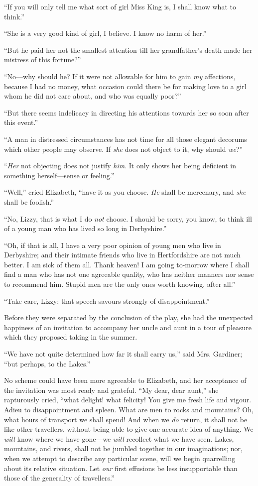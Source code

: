 \documentclass[12pt]{book}
\begin{document}
``If you will only tell me what sort of girl Miss King is, I shall know what to think.''

``She is a very good kind of girl, I believe. I know no harm of her.''

``But he paid her not the smallest attention till her grandfather's death made her mistress of this fortune?''

``No---why should he? If it were not allowable for him to gain \textit{my} affections, because I had no money, what occasion could there be for making love to a girl whom he did not care about, and who was equally poor?''

``But there seems indelicacy in directing his attentions towards her so soon after this event.''

``A man in distressed circumstances has not time for all those elegant decorums which other people may observe. If \textit{she} does not object to it, why should \textit{we}?''

``\textit{Her} not objecting does not justify \textit{him}. It only shows her being deficient in something herself---sense or feeling.''

``Well,'' cried Elizabeth, ``have it as you choose. \textit{He} shall be mercenary, and \textit{she} shall be foolish.''

``No, Lizzy, that is what I do \textit{not} choose. I should be sorry, you know, to think ill of a young man who has lived so long in Derbyshire.''

``Oh, if that is all, I have a very poor opinion of young men who live in Derbyshire; and their intimate friends who live in Hertfordshire are not much better. I am sick of them all. Thank heaven! I am going to-morrow where I shall find a man who has not one agreeable quality, who has neither manners nor sense to recommend him. Stupid men are the only ones worth knowing, after all.''

``Take care, Lizzy; that speech savours strongly of disappointment.''

Before they were separated by the conclusion of the play, she had the unexpected happiness of an invitation to accompany her uncle and aunt in a tour of pleasure which they proposed taking in the summer.

``We have not quite determined how far it shall carry us,'' said Mrs. Gardiner; ``but perhaps, to the Lakes.''

No scheme could have been more agreeable to Elizabeth, and her acceptance of the invitation was most ready and grateful. ``My dear, dear aunt,'' she rapturously cried, ``what delight! what felicity! You give me fresh life and vigour. Adieu to disappointment and spleen. What are men to rocks and mountains? Oh, what hours of transport we shall spend! And when we \textit{do} return, it shall not be like other travellers, without being able to give one accurate idea of anything. We \textit{will} know where we have gone---we \textit{will} recollect what we have seen. Lakes, mountains, and rivers, shall not be jumbled together in our imaginations; nor, when we attempt to describe any particular scene, will we begin quarrelling about its relative situation. Let \textit{our} first effusions be less insupportable than those of the generality of travellers.''
\end{document}
